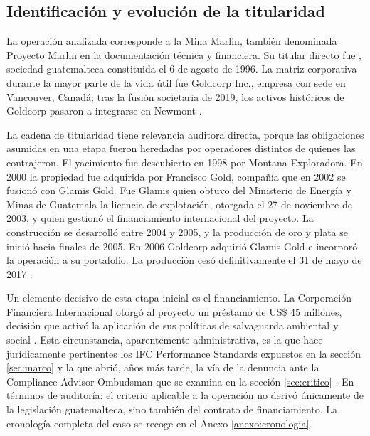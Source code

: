 \subsection{Identificación y evolución de la titularidad}

La operación analizada corresponde a la Mina Marlin, también denominada Proyecto
Marlin en la documentación técnica y financiera. Su titular directo fue
\titular, sociedad guatemalteca constituida el 6 de agosto de 1996. La matriz
corporativa durante la mayor parte de la vida útil fue Goldcorp Inc., empresa con
sede en Vancouver, Canadá; tras la fusión societaria de 2019, los activos
históricos de Goldcorp pasaron a integrarse en Newmont
\parencite{sec2011ni43101, goldcorp2023marlin}.

La cadena de titularidad tiene relevancia auditora directa, porque las
obligaciones asumidas en una etapa fueron heredadas por operadores distintos de
quienes las contrajeron. El yacimiento fue descubierto en 1998 por Montana
Exploradora. En 2000 la propiedad fue adquirida por Francisco Gold, compañía que
en 2002 se fusionó con Glamis Gold. Fue Glamis quien obtuvo del Ministerio de
Energía y Minas de Guatemala la licencia de explotación, otorgada el 27 de
noviembre de 2003, y quien gestionó el financiamiento internacional del proyecto.
La construcción se desarrolló entre 2004 y 2005, y la producción de oro y plata
se inició hacia finales de 2005. En 2006 Goldcorp adquirió Glamis Gold e incorporó
la operación a su portafolio. La producción cesó definitivamente el 31 de mayo de
2017 \parencite{sec2011ni43101, prensalibre2017cierre, goldcorp2023marlin}.

Un elemento decisivo de esta etapa inicial es el financiamiento. La Corporación
Financiera Internacional otorgó al proyecto un préstamo de US\$ 45 millones,
decisión que activó la aplicación de sus políticas de salvaguarda ambiental y
social \parencite{ifcsfmarlin}. Esta circunstancia, aparentemente administrativa,
es la que hace jurídicamente pertinentes los IFC Performance Standards expuestos
en la sección \ref{sec:marco} y la que abrió, años más tarde, la vía de la
denuncia ante la Compliance Advisor Ombudsman que se examina en la sección
\ref{sec:critico} \parencite{cao2006marlin}. En términos de auditoría: el
criterio aplicable a la operación no derivó únicamente de la legislación
guatemalteca, sino también del contrato de financiamiento. La cronología completa
del caso se recoge en el Anexo \ref{anexo:cronologia}.

